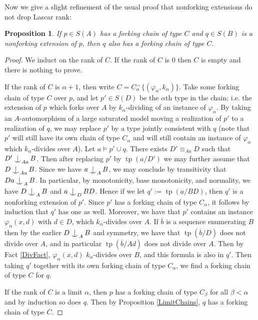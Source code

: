 \documentclass{article}
\DeclareMathOperator{\Ind}{Ind}
\DeclareMathOperator{\tp}{tp}
\def\Ind#1#2{#1\setbox0=\hbox{$#1x$}\kern\wd0\hbox to 0pt{\hss$#1\mid$\hss}
\lower.9\ht0\hbox to 0pt{\hss$#1\smile$\hss}\kern\wd0}
\def\ind{\mathop{\mathpalette\Ind{}}}
\newtheorem{prop}[theorem]{Proposition}
\theoremstyle{remark}
\theoremstyle{definition}
\begin{document}
Now we give a slight refinement of the usual proof that nonforking extensions do not drop Lascar rank:
\begin{prop}\label{ChainExtProp}
    If $p\in S(A)$ has a forking chain of type $C$ and $q\in S(B)$ is a nonforking extension of $p$, then $q$ also has a forking chain of type $C$.
\end{prop}
\begin{proof}
    We induct on the rank of $C$. If the rank of $C$ is 0 then $C$ is empty and there is nothing to prove.

    If the rank of $C$ is $\alpha+1$, then write $C=C_\alpha^\frown\{(\varphi_\alpha,k_\alpha)\}$. Take some forking chain of type $C$ over $p$, and let $p'\in S(D)$ be the $\alpha$th type in the chain; i.e. the extension of $p$ which forks over $A$ by $k_\alpha$-dividing of an instance of $\varphi_\alpha$. By taking an $A$-automorphism of a large saturated model moving a realization of $p'$ to a realization of $q$, we may replace $p'$ by a type jointly consistent with $q$ (note that $p'$ will still have its own chain of type $C_\alpha$ and will still contain an instance of $\varphi_\alpha$ which $k_\alpha$-divides over $A$). Let $a\models p'\cup q$. There exists $D'\equiv_{Aa} D$ such that $D'\ind_{Aa} B$. Then after replacing $p'$ by $\tp(a/D')$ we may further assume that $D\ind_{Aa}B$. Since we have $a\ind_A B$, we may conclude by transitivity that $Da\ind_A B$. In particular, by monotonicity, base monotonicity, and normality, we have $D\ind_A B$ and $a\ind_D BD$. Hence if we let $q':=\tp(a/BD)$, then $q'$ is a nonforking extension of $p'$. Since $p'$ has a forking chain of type $C_\alpha$, it follows by induction that $q'$ has one as well. Moreover, we have that $p'$ contains an instance $\varphi_\alpha(x,d)$ with $d\in D$, which $k_\alpha$-divides over $A$. If $\overline{b}$ is a sequence enumerating $B$ then by the earlier $D\ind_A B$ and symmetry, we have that $\tp(\overline{b}/D)$ does not divide over $A$, and in particular $\tp(\overline{b}/Ad)$ does not divide over $A$. Then by Fact \ref{DivFact}, $\varphi_\alpha(x,d)$ $k_\alpha$-divides over $B$, and this formula is also in $q'$. Then taking $q'$ together with its own forking chain of type $C_\alpha$, we find a forking chain of type $C$ for $q$.

    If the rank of $C$ is a limit $\alpha$, then $p$ has a forking chain of type $C_\beta$ for all $\beta<\alpha$ and by induction so does $q$. Then by Proposition \ref{LimitChains}, $q$ has a forking chain of type $C$.
\end{proof}
\end{document}
